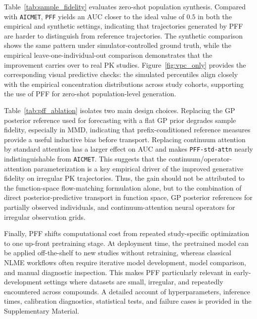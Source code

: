 Table~\ref{tab:sample_fidelity} evaluates zero-shot population synthesis.
%
Compared with \texttt{AICMET}, \texttt{PFF} yields an AUC closer to the ideal value of $0.5$ in both the empirical and synthetic settings, indicating that trajectories generated by PFF are harder to distinguish from reference trajectories.
%
The synthetic comparison shows the same pattern under simulator-controlled ground truth, while the empirical leave-one-individual-out comparison demonstrates that the improvement carries over to real PK studies.
%
Figure~\ref{fig:vpc_only} provides the corresponding visual predictive checks: the simulated percentiles align closely with the empirical concentration distributions across study cohorts, supporting the use of PFF for zero-shot population-level generation.

Table~\ref{tab:pff_ablation} isolates two main design choices.
%
Replacing the GP posterior reference used for forecasting with a flat GP prior degrades sample fidelity, especially in MMD, indicating that prefix-conditioned reference measures provide a useful inductive bias before transport.
%
Replacing continuum attention by standard attention has a larger effect on AUC and makes \texttt{PFF-std-attn} nearly indistinguishable from \texttt{AICMET}.
%
This suggests that the continuum/operator-attention parameterization is a key empirical driver of the improved generative fidelity on irregular PK trajectories.
%
Thus, the gain should not be attributed to the function-space flow-matching formulation alone, but to the combination of direct posterior-predictive transport in function space, GP posterior references for partially observed individuals, and continuum-attention neural operators for irregular observation grids.

Finally, PFF shifts computational cost from repeated study-specific optimization to one up-front pretraining stage.
%
At deployment time, the pretrained model can be applied off-the-shelf to new studies without retraining, whereas classical NLME workflows often require iterative model development, model comparison, and manual diagnostic inspection.
%
This makes PFF particularly relevant in early-development settings where datasets are small, irregular, and repeatedly encountered across compounds.
%
A detailed account of hyperparameters, inference times, calibration diagnostics, statistical tests, and failure cases is provided in the Supplementary Material.
